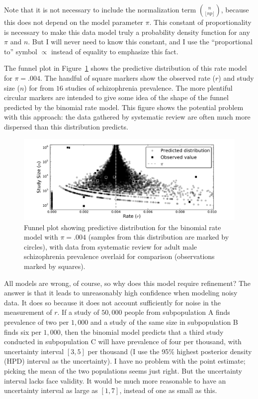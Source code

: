Note that it is not necessary to include the normalization term
$\binom{n}{\lfloor np\rfloor}$, because this does not depend on the
model parameter $\pi$. This constant of proportionality is necessary
to make this data model truly a probability density function for any
$\pi$ and $n$. But I will never need to know this constant, and I use
the ``proportional to'' symbol $\propto$ instead of equality to
emphasize this fact.

The funnel plot in Figure~\ref{rate-model-binom-funnel} shows the
predictive distribution of this rate model for $\pi=.004$.  The
handful of square markers show the observed rate ($r$) and study
size ($n$) for from $16$ studies of schizophrenia prevalence. The more
plentiful circular markers are intended to give some idea of the shape
of the funnel predicted by the binomial rate model.  This figure shows
the potential problem with this approach: the data gathered by
systematic review are often much more dispersed than this distribution
predicts.

\begin{figure}[ht]
\begin{center}
\includegraphics[width=\textwidth]{binomial-model-funnel.pdf}
\end{center}
\caption{Funnel plot showing predictive distribution for the binomial
  rate model with $\pi=.004$ (samples from this distribution are
  marked by circles), with data from systematic review for adult male
  schizophrenia prevalence overlaid for comparison (observations
  marked by squares).}
\label{rate-model-binom-funnel}
\end{figure}

All models are wrong, of course, so why does this model require
refinement? The answer is that it leads to unreasonably high
confidence when modeling noisy data.  It does so because it does not
account sufficiently for noise in the measurement of $r$. If a study
of $50,000$ people from subpopulation A finds prevalence of two per
$1,000$ and a study of the same size in subpopulation B finds six per
$1,000$, then the binomial model predicts that a third study conducted
in subpopulation C will have prevalence of four per thousand, with
uncertainty interval $[3,5]$ per thousand (I use the 95\% highest
posterior density (HPD) interval as the uncertainty).  I have no
problem with the point estimate; picking the mean of the two
populations seems just right.  But the uncertainty interval lacks face
validity.  It would be much more reasonable to have an uncertainty
interval as large as $[1,7]$, instead of one as small as this.

